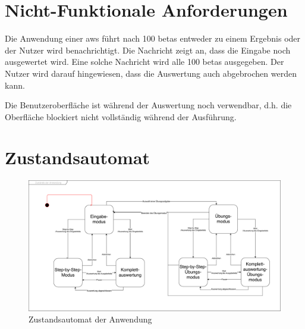 \documentclass[parskip=full,11pt,twoside]{scrartcl}
\begin{document}

\section{Nicht-Funktionale Anforderungen}


Die Anwendung einer \gls{aws} führt nach 100 \glspl{beta} entweder zu einem Ergebnis oder der Nutzer wird benachrichtigt.
Die Nachricht zeigt an, dass die Eingabe noch ausgewertet wird.
Eine solche Nachricht wird alle 100 \glspl{beta} ausgegeben.
Der Nutzer wird darauf hingewiesen, dass die Auswertung auch abgebrochen werden kann.

Die Benutzeroberfläche ist während der Auswertung noch verwendbar, d.h. die Oberfläche blockiert nicht vollständig während der Ausführung.

\section{Zustandsautomat}

\begin{figure}[H]
	\centering
	\includegraphics[width=\textwidth]{img/Zustandsautomat}
	\caption{\label{fig:state} Zustandsautomat der Anwendung}
\end{figure}
\end{document}
